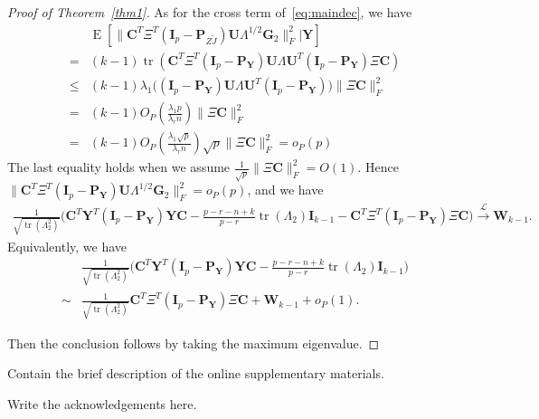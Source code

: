 \documentclass[12pt]{article} %
\DeclareMathOperator{\mytr}{tr}
\DeclareMathOperator{\myE}{E}
\newcommand{\bP}{\mathbf{P}}
\newcommand{\bY}{\mathbf{Y}}
\newcommand{\bG}{\mathbf{G}}
\newcommand{\bC}{\mathbf{C}}
\newcommand{\bI}{\mathbf{I}}
\newcommand{\bU}{\mathbf{U}}
\newcommand{\bW}{\mathbf{W}}
\theoremstyle{definition}
\begin{document}
\begin{proof}[\textrm{Proof of Theorem~\ref{thm1}}]
As for the cross term of~\eqref{eq:maindec}, we have
$$
\begin{aligned}
    &\myE [\|\bC^T \Xi^T (\bI_p -\bP_{Z\tilde{J}})\bU\Lambda^{1/2}\bG_2\|_F^2|\bY]\\
    = &
    (k-1)\mytr(\bC^T \Xi^T (\bI_p -\bP_{\bY})\bU\Lambda \bU^T (\bI_p -\bP_{\bY})\Xi \bC)\\
    \leq &
    (k-1)\lambda_1\big((\bI_p -\bP_{\bY})\bU\Lambda \bU^T (\bI_p -\bP_{\bY})\big)\|\Xi \bC\|^2_F\\
    = &
    (k-1) O_P(\frac{\lambda_1 p}{\lambda_r n})  \|\Xi \bC\|^2_F\\
    = &
    (k-1) O_P(\frac{\lambda_1 \sqrt{p}}{\lambda_r n}) \sqrt{p}  \|\Xi \bC\|^2_F=o_P(p)
\end{aligned}
$$
The last equality holds when we assume $\frac{1}{\sqrt{p}}\|\Xi \bC\|_F^2=O(1)$.
Hence $\|\bC^T \Xi^T (\bI_p -\bP_{\bY})\bU\Lambda^{1/2}\bG_2\|_F^2=o_P(p)$, and we have
$$
\begin{aligned}
\frac{1}{\sqrt{\mytr(\Lambda_2^2)}}
    \big( \bC^T\bY^T(\bI_p-\bP_{\bY}) \bY \bC
    -\tfrac{p-r-n+k}{p-r}\mytr(\Lambda_2)\bI_{k-1} -\bC^T \Xi^T (\bI_p-\bP_{\bY})\Xi \bC\big)
\xrightarrow{\mathcal{L}} \bW_{k-1}.
\end{aligned}
$$
    Equivalently, we have
    $$
    \begin{aligned}
        &\frac{1}{\sqrt{\mytr(\Lambda_2^2)}} {\Big(\bC^T\bY^T(\bI_p-\bP_{\bY}) \bY \bC- \frac{p-r-n+k}{p-r}\mytr(\Lambda_2)\bI_{k-1}}\Big)\\
        \sim&
\frac{1}{\sqrt{\mytr(\Lambda_2^2)}} \bC^T \Xi^T (\bI_p-\bP_{\bY})\Xi \bC
        +\bW_{k-1}+o_P(1).
    \end{aligned}
    $$

    Then the conclusion follows by taking the maximum eigenvalue.
\end{proof}

\vskip 14pt

Contain
the brief description of the online supplementary materials.
\par
\vskip 14pt

Write the acknowledgements here.
\par
\end{document}
